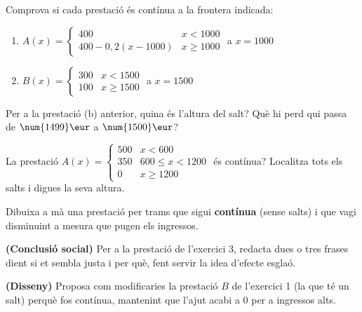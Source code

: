\begin{exercicis}
\begin{exlist}
  \item Comprova si cada prestació és contínua a la frontera indicada:
        \begin{enumerate}[label=\alph*), leftmargin=1.6em, topsep=2pt]
          \item $A(x)=\begin{cases}400 & x<\num{1000}\\ 400-0,2(x-\num{1000}) & x\ge\num{1000}\end{cases}$ a $x=\num{1000}$
          \item $B(x)=\begin{cases}300 & x<\num{1500}\\ 100 & x\ge\num{1500}\end{cases}$ a $x=\num{1500}$
        \end{enumerate}
  \item Per a la prestació (b) anterior, quina és l'altura del salt? Què hi perd qui
        passa de $\num{1499}\eur$ a $\num{1500}\eur$?
  \item La prestació $A(x)=\begin{cases}500 & x<600\\ 350 & 600\le x<1200\\ 0 & x\ge 1200\end{cases}$
        és contínua? Localitza tots els salts i digues la seva altura.
  \item Dibuixa a mà una prestació per trams que sigui \textbf{contínua} (sense salts)
        i que vagi disminuint a mesura que pugen els ingressos.
  \item \textbf{(Conclusió social)} Per a la prestació de l'exercici 3, redacta dues o
        tres frases dient si et sembla justa i per què, fent servir la idea d'efecte
        esglaó.
  \item \textbf{(Disseny)} Proposa com modificaries la prestació $B$ de l'exercici 1
        (la que té un salt) perquè fos contínua, mantenint que l'ajut acabi a $0$ per a
        ingressos alts.
\end{exlist}
\end{exercicis}

